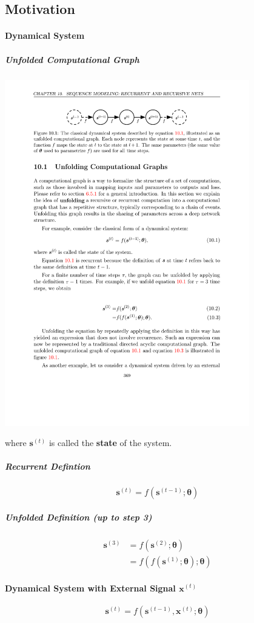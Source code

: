 \documentclass[12pt, a4paper]{article}
\def\vtheta{\boldsymbol{\theta}}
\newcommand{\egvs}[1]{\boldsymbol{s}^{(#1)}}
\newcommand{\egvx}[1]{\boldsymbol{x}^{(#1)}}
\begin{document}
\subsection{Motivation}

\paragraph{Dynamical System}
\subparagraph{Unfolded Computational Graph}
\begin{center}
    \includegraphics[width=0.8\textwidth]{../imgs/Dynamical_System.pdf}
\end{center}
where $\egvs{t}$ is called the \textbf{state} of the system.
\subparagraph{Recurrent Defintion}
\[
    \egvs{t} = f(\egvs{t-1};\vtheta)
\]
\subparagraph{Unfolded Definition (up to step 3)}
\[
    \begin{split}
        \egvs{3} &= f(\egvs{2};\vtheta)
        \\&= f(f(\egvs{1};\vtheta);\vtheta)
    \end{split}
\]

\paragraph{Dynamical System with External Signal $\egvx{t}$}
\[
    \egvs{t} = f(\egvs{t-1}, \egvx{t}; \vtheta)
\]
\end{document}
